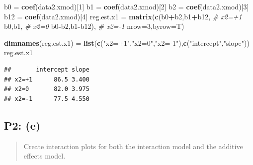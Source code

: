 \documentclass[
]{article}
\newenvironment{Shaded}{\begin{snugshade}}{\end{snugshade}}
\newcommand{\AttributeTok}[1]{\textcolor[rgb]{0.13,0.29,0.53}{#1}}
\newcommand{\CommentTok}[1]{\textcolor[rgb]{0.56,0.35,0.01}{\textit{#1}}}
\newcommand{\DecValTok}[1]{\textcolor[rgb]{0.00,0.00,0.81}{#1}}
\newcommand{\FunctionTok}[1]{\textcolor[rgb]{0.13,0.29,0.53}{\textbf{#1}}}
\newcommand{\NormalTok}[1]{#1}
\newcommand{\OtherTok}[1]{\textcolor[rgb]{0.56,0.35,0.01}{#1}}
\newcommand{\SpecialCharTok}[1]{\textcolor[rgb]{0.81,0.36,0.00}{\textbf{#1}}}
\newcommand{\StringTok}[1]{\textcolor[rgb]{0.31,0.60,0.02}{#1}}
\begin{document}
\begin{Shaded}
\begin{Highlighting}[]
\NormalTok{b0 }\OtherTok{=} \FunctionTok{coef}\NormalTok{(data2.xmod)[}\DecValTok{1}\NormalTok{]}
\NormalTok{b1 }\OtherTok{=} \FunctionTok{coef}\NormalTok{(data2.xmod)[}\DecValTok{2}\NormalTok{]}
\NormalTok{b2 }\OtherTok{=} \FunctionTok{coef}\NormalTok{(data2.xmod)[}\DecValTok{3}\NormalTok{]}
\NormalTok{b12 }\OtherTok{=} \FunctionTok{coef}\NormalTok{(data2.xmod)[}\DecValTok{4}\NormalTok{]}
\NormalTok{reg.est.x1 }\OtherTok{=} \FunctionTok{matrix}\NormalTok{(}\FunctionTok{c}\NormalTok{(b0}\SpecialCharTok{+}\NormalTok{b2,b1}\SpecialCharTok{+}\NormalTok{b12,  }\CommentTok{\# x2=+1}
\NormalTok{                      b0,b1,         }\CommentTok{\# x2=0}
\NormalTok{                      b0}\SpecialCharTok{{-}}\NormalTok{b2,b1}\SpecialCharTok{{-}}\NormalTok{b12), }\CommentTok{\# x2={-}1}
                    \AttributeTok{nrow=}\DecValTok{3}\NormalTok{,}\AttributeTok{byrow=}\NormalTok{T)}

\FunctionTok{dimnames}\NormalTok{(reg.est.x1) }\OtherTok{=} \FunctionTok{list}\NormalTok{(}\FunctionTok{c}\NormalTok{(}\StringTok{"x2=+1"}\NormalTok{,}\StringTok{"x2=0"}\NormalTok{,}\StringTok{"x2={-}1"}\NormalTok{),}\FunctionTok{c}\NormalTok{(}\StringTok{"intercept"}\NormalTok{,}\StringTok{"slope"}\NormalTok{))}
\NormalTok{reg.est.x1}
\end{Highlighting}
\end{Shaded}

\begin{verbatim}
##       intercept slope
## x2=+1      86.5 3.400
## x2=0       82.0 3.975
## x2=-1      77.5 4.550
\end{verbatim}

\hypertarget{p2-e}{%
\subsection{P2: (e)}\label{p2-e}}

\begin{quote}
Create interaction plots for both the interaction model and the additive
effects model.
\end{quote}

\begin{Shaded}
\end{Shaded}
\end{document}
